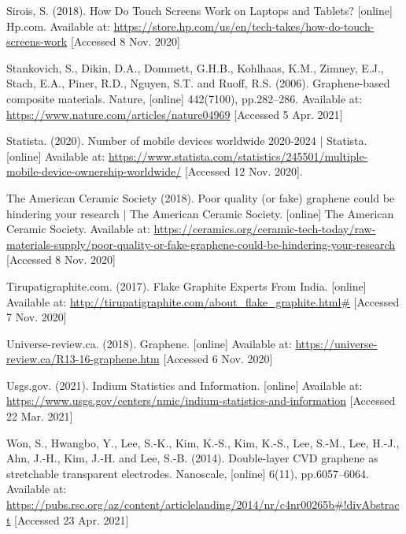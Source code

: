 \documentclass[a4paper,12pt]{article}
\numberwithin{equation}{section}
\numberwithin{figure}{section}
\begin{document}
\noindent Sirois, S. (2018). How Do Touch Screens Work on Laptops and Tablets? [online] Hp.com. Available at: \url{https://store.hp.com/us/en/tech-takes/how-do-touch-screens-work} [Accessed 8 Nov. 2020]\vspace{\baselineskip}

\noindent Stankovich, S., Dikin, D.A., Dommett, G.H.B., Kohlhaas, K.M., Zimney, E.J., Stach, E.A., Piner, R.D., Nguyen, S.T. and Ruoff, R.S. (2006). Graphene-based composite materials. Nature, [online] 442(7100), pp.282–286. Available at: \url{https://www.nature.com/articles/nature04969} [Accessed 5 Apr. 2021]\vspace{\baselineskip}

\noindent Statista. (2020). Number of mobile devices worldwide 2020-2024 | Statista. [online] Available at: \url{https://www.statista.com/statistics/245501/multiple-mobile-device-ownership-worldwide/} [Accessed 12 Nov. 2020].\vspace{\baselineskip}

\noindent The American Ceramic Society (2018). Poor quality (or fake) graphene could be hindering your research | The American Ceramic Society. [online] The American Ceramic Society. Available at: \url{https://ceramics.org/ceramic-tech-today/raw-materials-supply/poor-quality-or-fake-graphene-could-be-hindering-your-research} [Accessed 8 Nov. 2020]\vspace{\baselineskip}

\noindent Tirupatigraphite.com. (2017). Flake Graphite Experts From India. [online] Available at: \url{http://tirupatigraphite.com/about\_flake\_graphite.html\#} [Accessed 7 Nov. 2020]\vspace{\baselineskip}

\noindent Universe-review.ca. (2018). Graphene. [online] Available at: \url{https://universe-review.ca/R13-16-graphene.htm} [Accessed 6 Nov. 2020]\vspace{\baselineskip}

\noindent Usgs.gov. (2021). Indium Statistics and Information. [online] Available at: \url{https://www.usgs.gov/centers/nmic/indium-statistics-and-information} [Accessed 22 Mar. 2021]\vspace{\baselineskip}

\noindent Won, S., Hwangbo, Y., Lee, S.-K., Kim, K.-S., Kim, K.-S., Lee, S.-M., Lee, H.-J., Ahn, J.-H., Kim, J.-H. and Lee, S.-B. (2014). Double-layer CVD graphene as stretchable transparent electrodes. Nanoscale, [online] 6(11), pp.6057–6064. Available at: \url{https://pubs.rsc.org/az/content/articlelanding/2014/nr/c4nr00265b#!divAbstract} [Accessed 23 Apr. 2021]\vspace{\baselineskip}
\end{document}
